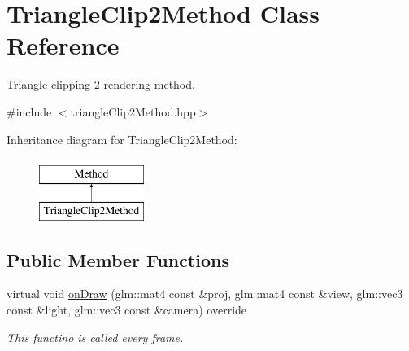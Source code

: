 \hypertarget{classTriangleClip2Method}{}\section{Triangle\+Clip2\+Method Class Reference}
\label{classTriangleClip2Method}


Triangle clipping 2 rendering method.  




{\ttfamily \#include $<$triangle\+Clip2\+Method.\+hpp$>$}

Inheritance diagram for Triangle\+Clip2\+Method\+:\begin{figure}[H]
\begin{center}
\leavevmode
\includegraphics[height=2.000000cm]{classTriangleClip2Method}
\end{center}
\end{figure}
\subsection*{Public Member Functions}
\begin{DoxyCompactItemize}
\item 
virtual void \hyperlink{classTriangleClip2Method_a8433b228a45401ae637ec6d65a047ea5}{on\+Draw} (glm\+::mat4 const \&proj, glm\+::mat4 const \&view, glm\+::vec3 const \&light, glm\+::vec3 const \&camera) override
\begin{DoxyCompactList}\small\item\em This functino is called every frame. \end{DoxyCompactList}\end{DoxyCompactItemize}
